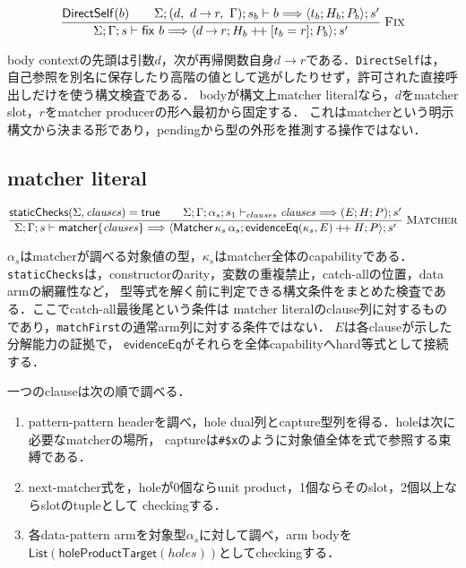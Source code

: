\documentclass[11pt,a4paper,oneside]{ltjsbook}
\newcommand{\code}[1]{\texttt{#1}}
\newcommand{\Matcher}{\mathsf{Matcher}}
\newcommand{\fn}{\mathbin{\to}}
\begin{document}
\[
\frac{
  \mathsf{DirectSelf}(b)\qquad
  \Sigma;(d,\ d\fn r,\ \Gamma);s_b\vdash b
    \Longrightarrow\langle t_b;H_b;P_b\rangle;s'
}{
  \Sigma;\Gamma;s\vdash\mathsf{fix}\ b
  \Longrightarrow\langle d\fn r;H_b\mathbin{+\!+}[t_b=r];P_b\rangle;s'
}\;\textsc{Fix}
\]

body contextの先頭は引数$d$，次が再帰関数自身$d\fn r$である．\code{DirectSelf}は，
自己参照を別名に保存したり高階の値として逃がしたりせず，許可された直接呼出しだけを使う構文検査である．
bodyが構文上matcher literalなら，$d$をmatcher slot，$r$をmatcher producerの形へ最初から固定する．
これはmatcherという明示構文から決まる形であり，pendingから型の外形を推測する操作ではない．

\subsection{matcher literal}

\[
\frac{
  \mathsf{staticChecks}(\Sigma,\mathit{clauses})=\mathsf{true}
  \qquad
  \Sigma;\Gamma;\alpha_s;s_1\vdash_{clauses}
    \mathit{clauses}\Longrightarrow(E;H;P);s'
}{
  \Sigma;\Gamma;s\vdash\mathsf{matcher}\{\mathit{clauses}\}
  \Longrightarrow
  \langle\Matcher\,\kappa_s\,\alpha_s;
  \mathsf{evidenceEq}(\kappa_s,E)\mathbin{+\!+}H;P\rangle;s'
}\;\textsc{Matcher}
\]

$\alpha_s$はmatcherが調べる対象値の型，$\kappa_s$はmatcher全体のcapabilityである．
\code{staticChecks}は，constructorのarity，変数の重複禁止，catch-allの位置，data armの網羅性など，
型等式を解く前に判定できる構文条件をまとめた検査である．ここでcatch-all最後尾という条件は
matcher literalのclause列に対するものであり，\code{matchFirst}の通常arm列に対する条件ではない．
$E$は各clauseが示した分解能力の証拠で，
$\mathsf{evidenceEq}$がそれらを全体capabilityへhard等式として接続する．

一つのclauseは次の順で調べる．

\begin{enumerate}[leftmargin=2em]
  \item pattern-pattern headerを調べ，hole dual列とcapture型列を得る．holeは次に必要なmatcherの場所，
        captureは\code{\#\$x}のように対象値全体を式で参照する束縛である．
  \item next-matcher式を，holeが0個ならunit product，1個ならそのslot，2個以上ならslotのtupleとして
        checkingする．
  \item 各data-pattern armを対象型$\alpha_s$に対して調べ，arm bodyを
        $\mathsf{List}(\mathsf{holeProductTarget}(\mathit{holes}))$としてcheckingする．
\end{enumerate}
\end{document}
